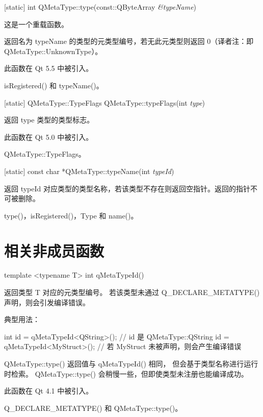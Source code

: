 [static] int QMetaType::type(const::QByteArray \emph{\&typeName})

这是一个重载函数。

返回名为 typeName 的类型的元类型编号，若无此元类型则返回 0（译者注：即QMetaType::UnknownType）。

此函数在 Qt 5.5 中被引入。

\begin{seeAlso}
isRegistered() 和 typeName()。
\end{seeAlso}

[static] QMetaType::TypeFlags QMetaType::typeFlags(int \emph{type})

返回 type 类型的类型标志。

此函数在 Qt 5.0 中被引入。

\begin{seeAlso}
QMetaType::TypeFlags。
\end{seeAlso}

[static] const char *QMetaType::typeName(int \emph{typeId})

返回 typeId 对应类型的类型名称，若该类型不存在则返回空指针。返回的指针不可被删除。

\begin{seeAlso}
type()，isRegistered()，Type 和 name()。
\end{seeAlso}

\section{相关非成员函数}

template <typename T> int qMetaTypeId()

返回类型 T 对应的元类型编号。
若该类型未通过 Q\_DECLARE\_METATYPE() 声明，则会引发编译错误。

典型用法：

\begin{cppcode}
int id = qMetaTypeId<QString>();    // id 是 QMetaType::QString
id = qMetaTypeId<MyStruct>();       // 若 MyStruct 未被声明，则会产生编译错误
\end{cppcode}

QMetaType::type() 返回值与 qMetaTypeId() 相同，
但会基于类型名称进行运行时检索。
QMetaType::type() 会稍慢一些，但即使类型未注册也能编译成功。

此函数在 Qt 4.1 中被引入。

\begin{seeAlso}
Q\_DECLARE\_METATYPE() 和 QMetaType::type()。
\end{seeAlso}

